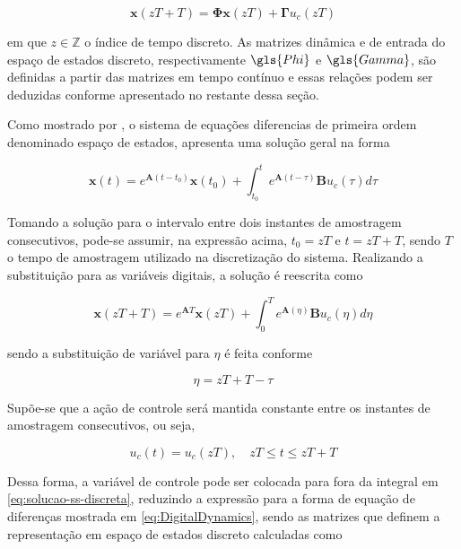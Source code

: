 \begin{equation}\label{eq:DigitalDynamics}
    \boldsymbol{x}(zT+T) = \boldsymbol{\Phi}\boldsymbol{x}(zT) + \boldsymbol{\Gamma}u_{c}(zT)
\end{equation}

\noindent em que $z \in \mathbb{Z}$ o índice de tempo discreto. As matrizes dinâmica e de entrada do espaço de estados discreto, respectivamente $\gls{Phi}$ e $\gls{Gamma}$, são definidas a partir das matrizes em tempo contínuo e essas relações podem ser deduzidas conforme apresentado no restante dessa seção.

Como mostrado por \textcite{book:Franklin}, o sistema de equações diferencias de primeira ordem denominado espaço de estados, apresenta uma solução geral na forma

\begin{equation}\label{eq:solucao-ss}
    \boldsymbol{x}(t) = e^{\boldsymbol{A}(t-t_{0})}\boldsymbol{x}(t_{0}) + \int_{t_{0}}^{t} e^{\boldsymbol{A}(t-\tau)}\boldsymbol{B}u_{c}(\tau) d\tau
\end{equation}

Tomando a solução para o intervalo entre dois instantes de amostragem consecutivos, pode-se assumir, na expressão acima, $t_{0}=zT$ e $t=zT+T$, sendo $T$ o tempo de amostragem utilizado na discretização do sistema. Realizando a substituição para as variáveis digitais, a solução é reescrita como

\begin{equation}\label{eq:solucao-ss-discreta}
    \boldsymbol{x}(zT+T) = e^{\boldsymbol{A}T}\boldsymbol{x}(zT) + \int_{0}^{T} e^{\boldsymbol{A}(\eta)}\boldsymbol{B}u_{c}(\eta) d\eta
\end{equation}

\noindent sendo a substituição de variável para $\eta$ é feita conforme

\begin{equation}\label{eq:substituicao-variavel}
    \eta = zT + T - \tau
\end{equation}

Supõe-se que a ação de controle será mantida constante entre os instantes de amostragem consecutivos, ou seja,

\begin{equation}\label{eq:control-zoh}
    u_{c}(t) = u_{c}(zT), \quad zT \leq t \leq zT+T
\end{equation}

Dessa forma, a variável de controle pode ser colocada para fora da integral em \eqref{eq:solucao-ss-discreta}, reduzindo a expressão para a forma de equação de diferenças mostrada em \eqref{eq:DigitalDynamics}, sendo as matrizes que definem a representação em espaço de estados discreto calculadas como

